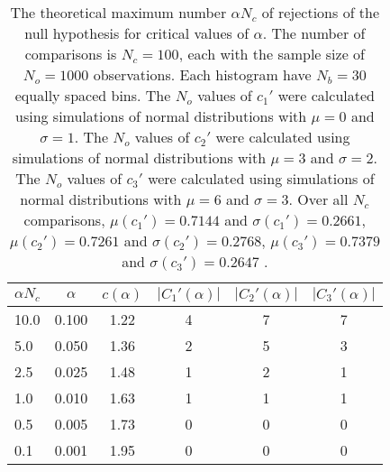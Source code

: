 \begin{table}[h!]
\begin{center}
\begin{tabular}{| l | c | c | c | c | c |}\hline
$\alpha N_c$ & $\alpha$ & $c(\alpha)$ & $|C_1'(\alpha)|$ & $|C_2'(\alpha)|$ & $|C_3'(\alpha)|$ \\\hline
10.0 & 0.100 & 1.22 & 4 & 7 & 7 \\\hline
5.0 & 0.050 & 1.36 & 2 & 5 & 3 \\\hline
2.5 & 0.025 & 1.48 & 1 & 2 & 1 \\\hline
1.0 & 0.010 & 1.63 & 1 & 1 & 1 \\\hline
0.5 & 0.005 & 1.73 & 0 & 0 & 0 \\\hline
0.1 & 0.001 & 1.95 & 0 & 0 & 0 \\\hline
\end{tabular}
\caption{The theoretical maximum number $\alpha N_c$ of rejections
of the null hypothesis for critical values of $\alpha$.
The number of comparisons is $N_c=100$,
each with the sample size of $N_o=1000$ observations.
Each histogram have $N_b=30$ equally spaced bins.
The $N_o$ values of $c_1'$ were calculated using simulations of
 normal distributions with $\mu=0$ and $\sigma=1$.
The $N_o$ values of $c_2'$ were calculated using simulations of
 normal distributions with $\mu=3$ and $\sigma=2$.
The $N_o$ values of $c_3'$ were calculated using simulations of
 normal distributions with $\mu=6$ and $\sigma=3$.
Over all $N_c$ comparisons,
 $\mu(c_1')=0.7144$ and $\sigma(c_1')=0.2661$,
 $\mu(c_2')=0.7261$ and $\sigma(c_2')=0.2768$,
 $\mu(c_3')=0.7379$ and $\sigma(c_3')=0.2647$ .
}
\end{center}
\end{table}